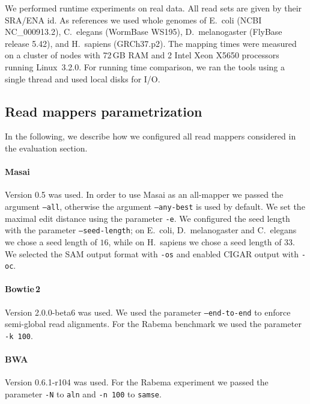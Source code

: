 We performed runtime experiments on real data.
All read sets are given by their SRA/ENA id.
As references we used whole genomes of E.~coli (NCBI NC\_000913.2), C.~elegans (WormBase WS195), D.~melanogaster (FlyBase release 5.42), and H.~sapiens (GRCh37.p2).
The mapping times were measured on a cluster of nodes with 72\,GB RAM and 2 Intel Xeon X5650 processors running Linux~3.2.0.
For running time comparison, we ran the tools using a single thread and used local disks for I/O.

\subsection{Read mappers parametrization}

In the following, we describe how we configured all read mappers considered in the evaluation section.

\paragraph{Masai}
Version 0.5 was used.
In order to use Masai as an all-mapper we passed the argument \texttt{--all}, otherwise the argument \texttt{--any-best} is used by default.
We set the maximal edit distance using the parameter \texttt{-e}.
We configured the seed length with the parameter \texttt{--seed-length}; on E.~coli, D.~melanogaster and C.~elegans we chose a seed length of $16$, while on H.~sapiens we chose a seed length of $33$.
We selected the SAM output format with \texttt{-os} and enabled CIGAR output with \texttt{-oc}.

\paragraph{Bowtie\,2}
Version 2.0.0-beta6 was used.
We used the parameter \texttt{--end-to-end} to enforce semi-global read alignments.
For the Rabema benchmark we used the parameter \texttt{-k 100}.

\paragraph{BWA}
Version 0.6.1-r104 was used.
For the Rabema experiment we passed the parameter \texttt{-N} to \texttt{aln} and \texttt{-n 100} to \texttt{samse}.

